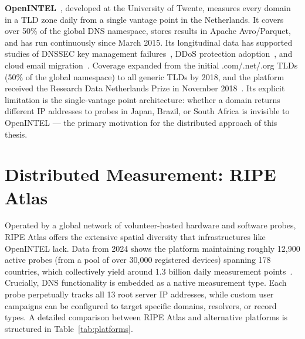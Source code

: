 \textbf{OpenINTEL}~\cite{vanRijswijk2016}, developed at the University of Twente, measures every domain in a \ac{TLD} zone daily from a single vantage point in the Netherlands. It covers over 50\% of the global \ac{DNS} namespace, stores results in Apache Avro/Parquet, and has run continuously since March 2015. Its longitudinal data has supported studies of \ac{DNSSEC} key management failures~\cite{Chung2017}, \ac{DDoS} protection adoption~\cite{Jonker2016}, and cloud email migration~\cite{vanRijswijk2018blog}. Coverage expanded from the initial .com/.net/.org \ac{TLD}s (50\% of the global namespace) to all generic \ac{TLD}s by 2018, and the platform received the Research Data Netherlands Prize in November 2018~\cite{vanRijswijk2018blog}. Its explicit limitation is the single-vantage point architecture: whether a domain returns different \ac{IP} addresses to probes in Japan, Brazil, or South Africa is invisible to OpenINTEL — the primary motivation for the distributed approach of this thesis.


\section{Distributed Measurement: RIPE Atlas}
\label{sec:2.3}

Operated by a global network of volunteer-hosted hardware and software probes, RIPE Atlas offers the extensive spatial diversity that infrastructures like OpenINTEL lack. Data from 2024 shows the platform maintaining roughly 12,900 active probes (from a pool of over 30,000 registered devices) spanning 178 countries, which collectively yield around 1.3 billion daily measurement points~\cite{Nosyk2025}. Crucially, \ac{DNS} functionality is embedded as a native measurement type. Each probe perpetually tracks all 13 root server IP addresses, while custom user campaigns can be configured to target specific domains, resolvers, or record types. A detailed comparison between RIPE Atlas and alternative platforms is structured in Table~\ref{tab:platforms}.

